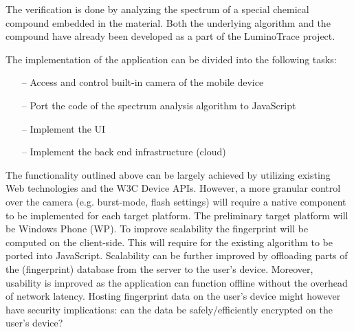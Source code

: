 \documentclass[thesis.tex]{subfiles}
\begin{document}
The verification is done by analyzing the spectrum of a special chemical compound embedded in the material. Both the underlying algorithm and the compound have already been developed as a part of the LuminoTrace project.

The implementation of the application can be divided into the following tasks:

\begin{itemize}
\item[--]Access and control built-in camera of the mobile device
\item[--]Port the code of the spectrum analysis algorithm to JavaScript
\item[--]Implement the UI
\item[--]Implement the back end infrastructure (cloud)
\end{itemize}

The functionality outlined above can be largely achieved by utilizing existing Web technologies and the W3C Device APIs. However, a more granular control over the camera (e.g. burst-mode, flash settings) will require a native component to be implemented for each target platform. The preliminary target platform will be Windows Phone (WP). To improve scalability the fingerprint will be computed on the client-side. This will require for the existing algorithm to be ported into JavaScript. Scalability can be further improved by offloading parts of the (fingerprint) database from the server to the user's device. Moreover, usability is improved as the application can function offline without the overhead of network latency. Hosting fingerprint data on the user's device might however have security implications: can the data be safely/efficiently encrypted on the user's device?
\end{document}
